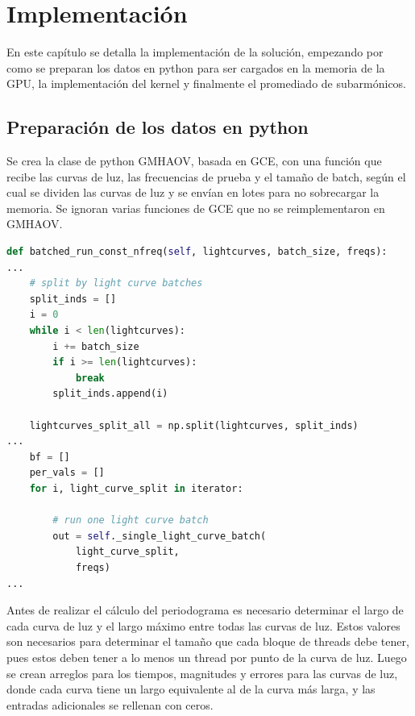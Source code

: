\chapter{Implementación}\label{chap:implementación}
En este capítulo se detalla la implementación de la solución, empezando por como se preparan los datos en python para ser cargados en la memoria de la GPU, la implementación del kernel y finalmente el promediado de subarmónicos.
\section{Preparación de los datos en python}\label{sec:preparacion-datos}
Se crea la clase de python GMHAOV, basada en GCE, con una función que recibe las curvas de luz, las frecuencias de prueba y el tamaño de batch, según el cual se dividen las curvas de luz y se envían en lotes para no sobrecargar la memoria. Se ignoran varias funciones de GCE que no se reimplementaron en GMHAOV.
\begin{lstlisting}[language=Python]
def batched_run_const_nfreq(self, lightcurves, batch_size, freqs):
...
    # split by light curve batches
    split_inds = []
    i = 0
    while i < len(lightcurves):
        i += batch_size
        if i >= len(lightcurves):
            break
        split_inds.append(i)

    lightcurves_split_all = np.split(lightcurves, split_inds)
...
    bf = []
    per_vals = []
    for i, light_curve_split in iterator:

        # run one light curve batch
        out = self._single_light_curve_batch(
            light_curve_split,
            freqs)
...
\end{lstlisting}

Antes de realizar el cálculo del periodograma es necesario determinar el largo de cada curva de luz y el largo máximo entre todas las curvas de luz. Estos valores son necesarios para determinar el tamaño que cada bloque de threads debe tener, pues estos deben tener a lo menos un thread por punto de la curva de luz. Luego se crean arreglos para los tiempos, magnitudes y errores para las curvas de luz, donde cada curva tiene un largo equivalente al de la curva más larga, y las entradas adicionales se rellenan con ceros.

